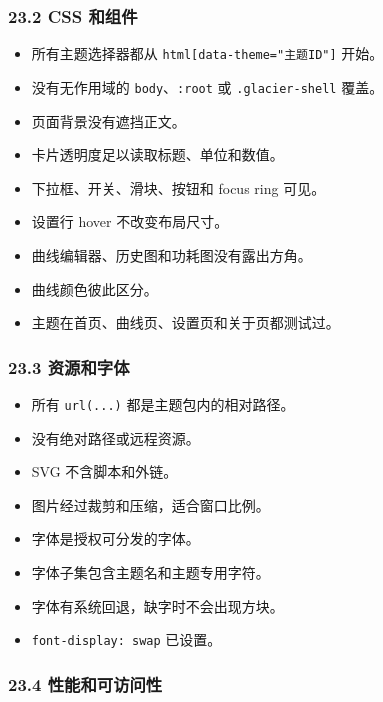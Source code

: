 \documentclass[UTF8,11pt,a4paper]{ctexart}
\providecommand{\tightlist}{%
  \setlength{\itemsep}{0pt}\setlength{\parskip}{0pt}}
\begin{document}
\subsubsection{23.2 CSS 和组件}\label{232-css-ux548cux7ec4ux4ef6}

\begin{itemize}
\tightlist
\item[$\square$]
  所有主题选择器都从 \texttt{html{[}data-theme="主题ID"{]}} 开始。
\item[$\square$]
  没有无作用域的 \texttt{body}、\texttt{:root} 或
  \texttt{.glacier-shell} 覆盖。
\item[$\square$]
  页面背景没有遮挡正文。
\item[$\square$]
  卡片透明度足以读取标题、单位和数值。
\item[$\square$]
  下拉框、开关、滑块、按钮和 focus ring 可见。
\item[$\square$]
  设置行 hover 不改变布局尺寸。
\item[$\square$]
  曲线编辑器、历史图和功耗图没有露出方角。
\item[$\square$]
  曲线颜色彼此区分。
\item[$\square$]
  主题在首页、曲线页、设置页和关于页都测试过。
\end{itemize}

\subsubsection{23.3
资源和字体}\label{233-ux8d44ux6e90ux548cux5b57ux4f53}

\begin{itemize}
\tightlist
\item[$\square$]
  所有 \texttt{url(...)} 都是主题包内的相对路径。
\item[$\square$]
  没有绝对路径或远程资源。
\item[$\square$]
  SVG 不含脚本和外链。
\item[$\square$]
  图片经过裁剪和压缩，适合窗口比例。
\item[$\square$]
  字体是授权可分发的字体。
\item[$\square$]
  字体子集包含主题名和主题专用字符。
\item[$\square$]
  字体有系统回退，缺字时不会出现方块。
\item[$\square$]
  \texttt{font-display:\ swap} 已设置。
\end{itemize}

\subsubsection{23.4
性能和可访问性}\label{234-ux6027ux80fdux548cux53efux8bbfux95eeux6027}
\end{document}
